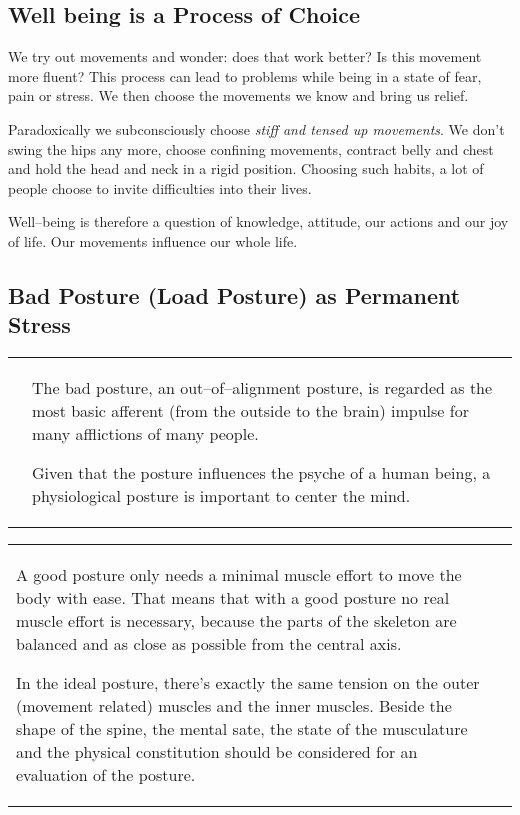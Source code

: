 \documentclass[../main.tex]{subfiles}
\begin{document}
\subsection{Well being is a Process of Choice}

We try out movements and wonder: does that {work better}?
Is this movement more fluent?
This process can lead to problems while being in a state of fear, pain or stress.
We then choose the movements we know and bring us relief.

Paradoxically we subconsciously choose \emph{stiff and tensed up movements}.
We don't swing the hips any more, choose confining movements, contract belly and chest and hold the head and neck in a rigid position.
Choosing such habits, a lot of people choose to  {invite difficulties} into their lives.

{Well--being} is therefore a question of knowledge, attitude, our actions and our joy of life.
Our movements influence our whole life.

\subsection{Bad Posture (Load Posture) as Permanent Stress}

\noindent
\begin{tabular}{p{4cm}p{7.6cm}}

  \raisebox{-0.8\totalheight}{  \texttt{[image: Thumb\_head]} }

  &
The bad posture\index{posture!bad}, an out--of--alignment posture, is regarded as the {most basic afferent} (from the outside to the brain) impulse for many afflictions of many people. 

Given that the posture influences the psyche of a human being, a physiological posture is important to {center the mind}.\index{posture!psyche} 
\end{tabular}

\noindent
\begin{tabular}{p{7.6cm}p{4cm}}
A good posture only needs a {minimal muscle effort to move} the body with ease.\index{posture!good, natural}
That means that with a good posture no real muscle effort is necessary, because the parts of the skeleton are {balanced} and as close as possible from the {central axis}. 

In the ideal posture, there's exactly the {same tension} on the outer (movement related) muscles and the inner muscles.
{Beside the shape of the spine, the mental sate, the state of the musculature and the physical constitution should be considered for an evaluation of the posture.}
  &
     \raisebox{-0.85\totalheight}{  \texttt{[image: Smiling\_Guy]} }
\end{tabular}
\end{document}
